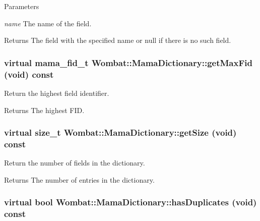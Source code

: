 \begin{DoxyParams}{Parameters}
\item[{\em name}]The name of the field. \end{DoxyParams}
\begin{DoxyReturn}{Returns}
The field with the specified name or null if there is no such field. 
\end{DoxyReturn}
\hypertarget{classWombat_1_1MamaDictionary_ab4bfc4aece1df3434197b883fedfc277}{
\subsubsection[{getMaxFid}]{\setlength{\rightskip}{0pt plus 5cm}virtual mama\_\-fid\_\-t Wombat::MamaDictionary::getMaxFid (void) const}}
\label{classWombat_1_1MamaDictionary_ab4bfc4aece1df3434197b883fedfc277}


Return the highest field identifier. \begin{DoxyReturn}{Returns}
The highest FID. 
\end{DoxyReturn}
\hypertarget{classWombat_1_1MamaDictionary_af48a73aa0079ff9ec526db90ca209579}{
\subsubsection[{getSize}]{\setlength{\rightskip}{0pt plus 5cm}virtual size\_\-t Wombat::MamaDictionary::getSize (void) const}}
\label{classWombat_1_1MamaDictionary_af48a73aa0079ff9ec526db90ca209579}


Return the number of fields in the dictionary. \begin{DoxyReturn}{Returns}
The number of entries in the dictionary. 
\end{DoxyReturn}
\hypertarget{classWombat_1_1MamaDictionary_a3d75c1b4461c1dab591f7ac030ab6fed}{
\subsubsection[{hasDuplicates}]{\setlength{\rightskip}{0pt plus 5cm}virtual bool Wombat::MamaDictionary::hasDuplicates (void) const}}
\label{classWombat_1_1MamaDictionary_a3d75c1b4461c1dab591f7ac030ab6fed}


